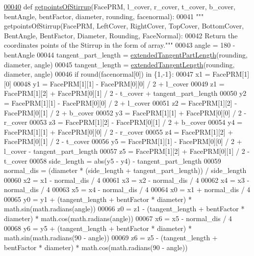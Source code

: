 \begin{DoxyCode}
\hypertarget{namespaceStirrup.tex_l00040}{}\hyperlink{namespaceStirrup_aa6df5118806bfe9d3a799e1bf549bb0a}{00040} \textcolor{keyword}{def }\hyperlink{namespaceStirrup_aa6df5118806bfe9d3a799e1bf549bb0a}{getpointsOfStirrup}(FacePRM, l\_cover, r\_cover, t\_cover, b\_cover, bentAngle, 
      bentFactor, diameter, rounding, facenormal):
00041     \textcolor{stringliteral}{""" getpointsOfStirrup(FacePRM, LeftCover, RightCover, TopCover, BottomCover, BentAngle, BentFactor,
       Diameter, Rounding, FaceNormal):}
00042 \textcolor{stringliteral}{    Return the coordinates points of the Stirrup in the form of array."""}
00043     angle = 180 - bentAngle
00044     tangent\_part\_length = \hyperlink{namespaceRebarfunc_aaeecb468e0fcfc5eee69d6a24c5c5aef}{extendedTangentPartLength}(rounding, diameter, angle)
00045     tangent\_length = \hyperlink{namespaceRebarfunc_ab5637ab0a8e202409ee8657d39ca87a0}{extendedTangentLength}(rounding, diameter, angle)
00046     \textcolor{keywordflow}{if} round(facenormal[0]) \textcolor{keywordflow}{in} \{1,-1\}:
00047         x1 = FacePRM[1][0]
00048         y1 = FacePRM[1][1] - FacePRM[0][0] / 2 + l\_cover
00049         z1 = FacePRM[1][2] + FacePRM[0][1] / 2 - t\_cover + tangent\_part\_length
00050         y2 = FacePRM[1][1] - FacePRM[0][0] / 2 + l\_cover
00051         z2 = FacePRM[1][2] - FacePRM[0][1] / 2 + b\_cover
00052         y3 = FacePRM[1][1] + FacePRM[0][0] / 2 - r\_cover
00053         z3 = FacePRM[1][2] - FacePRM[0][1] / 2 + b\_cover
00054         y4 = FacePRM[1][1] + FacePRM[0][0] / 2 - r\_cover
00055         z4 = FacePRM[1][2] + FacePRM[0][1] / 2 - t\_cover
00056         y5 = FacePRM[1][1] - FacePRM[0][0] / 2 + l\_cover - tangent\_part\_length
00057         z5 = FacePRM[1][2] + FacePRM[0][1] / 2 - t\_cover
00058         side\_length = abs(y5 - y4) - tangent\_part\_length
00059         normal\_dis = (diameter * (side\_length + tangent\_part\_length)) / side\_length
00060         x2 = x1 - normal\_dis / 4
00061         x3 = x2 - normal\_dis / 4
00062         x4 = x3 - normal\_dis / 4
00063         x5 = x4 - normal\_dis / 4
00064         x0 = x1 + normal\_dis / 4
00065         y0 = y1 + (tangent\_length + bentFactor * diameter) * math.sin(math.radians(angle))
00066         z0 = z1 - (tangent\_length + bentFactor * diameter) * math.cos(math.radians(angle))
00067         x6 = x5 - normal\_dis / 4
00068         y6 = y5 + (tangent\_length + bentFactor * diameter) * math.sin(math.radians(90 - angle))
00069         z6 = z5 - (tangent\_length + bentFactor * diameter) * math.cos(math.radians(90 - angle))

\end{DoxyCode}
